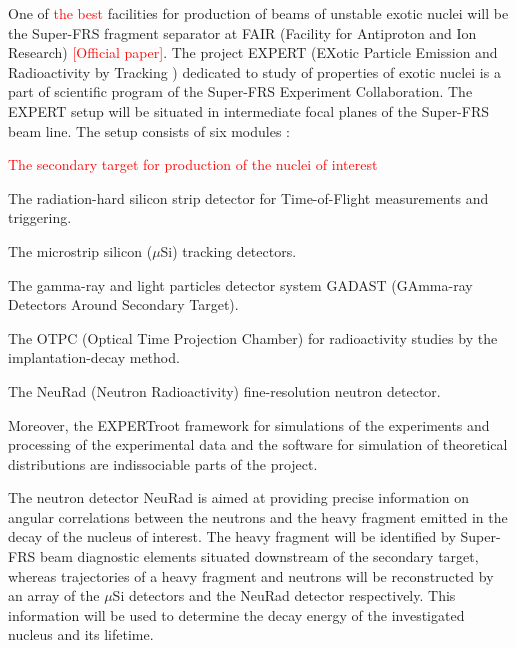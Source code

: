 \documentclass{webofc}
\newcommand{\red}[1]{\textcolor{red}{#1}}
\begin{document}
One of \red{the best} facilities for production of beams of unstable exotic nuclei will be the Super-FRS fragment separator at FAIR (Facility for Antiproton and Ion Research) \red{[Official paper]}. The project EXPERT (EXotic Particle Emission and Radioactivity by Tracking \cite{IMexpert}) dedicated to study of properties of exotic nuclei is a part of scientific program of the Super-FRS Experiment Collaboration. The EXPERT setup will be situated in intermediate focal planes of the Super-FRS beam line. The setup consists of six modules \cite{tdr}:
\begin{inparaenum}[(i)]
	\item \red{The secondary target for production of the nuclei of interest}
	\item The radiation-hard silicon strip detector for Time-of-Flight measurements and triggering.
	\item The microstrip silicon ($\mu$Si) tracking detectors.
	\item The gamma-ray and light particles detector system GADAST (GAmma-ray Detectors Around Secondary Target).
	\item The OTPC (Optical Time Projection Chamber) for radioactivity studies by the implantation-decay method.
	\item The NeuRad (Neutron Radioactivity) fine-resolution neutron detector.
\end{inparaenum}

Moreover, the EXPERTroot framework \cite{er} for simulations of the experiments and processing of the experimental data and the software for simulation of theoretical distributions are indissociable parts of the project.



The neutron detector NeuRad is aimed at providing precise information on angular correlations between the neutrons and the heavy fragment emitted in the decay of the nucleus of interest. The heavy fragment will be identified by Super-FRS beam diagnostic elements situated downstream of the secondary target, whereas trajectories of a heavy fragment and neutrons will be reconstructed by an array of the $\mu$Si detectors and the NeuRad detector respectively. This information will be used to determine the decay energy of the investigated nucleus and its lifetime.
\end{document}

